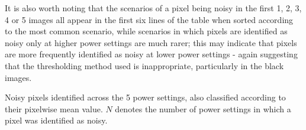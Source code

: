 \documentclass[10pt,fleqn]{article}
\begin{document}
It is also worth noting that the scenarios of a pixel being noisy in the first 1, 2, 3, 4 or 5 images all appear in the first six lines of the table when sorted according to the most common scenario, while scenarios in which pixels are identified as noisy only at higher power settings are much rarer; this may indicate that pixels are more frequently identified as noisy at lower power settings - again suggesting that the thresholding method used is inappropriate, particularly in the black images. 

\begin{table}[!ht] %
\begin{footnotesize}
\caption{Noisy pixels identified across the 5 power settings, also classified according to their pixelwise mean value. $N$ denotes the number of power settings in which a pixel was identified as noisy.}

%
		{\csvlinetotablerow}%
\end{footnotesize}

\end{table}
\end{document}
